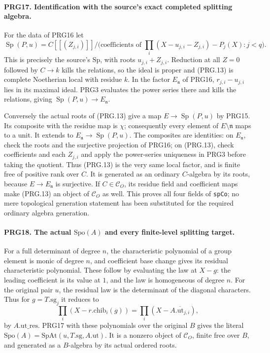 \paragraph{PRG17. Identification with the source's exact completed splitting algebra.}
\label{claim:PRG17}
For the data of PRG16 let
\[
 \operatorname{Sp}(P,u)=
 C[[(Z_{j,i})]]/
 \bigl(\text{coefficients of }
      \prod_i(X-u_{j,i}-Z_{j,i})-P_j(X):j<q\bigr).          \tag{PRG.13}
\]
This is precisely the source's \(\mathrm{Sp}\), with roots
\(u_{j,i}+Z_{j,i}\). Reduction at all \(Z=0\) followed by
\(C\to k\) kills the relations, so the ideal is proper and
(PRG.13) is complete Noetherian local with residue \(k\).
In the factor \(E_{\mathfrak n}\) of PRG16,
\(r_{j,i}-u_{j,i}\) lies in its maximal ideal. PRG3 evaluates
the power series there and kills the relations, giving
\(\operatorname{Sp}(P,u)\to E_{\mathfrak n}\).

Conversely the actual roots of (PRG.13) give a map
\(E\to\operatorname{Sp}(P,u)\) by PRG15. Its composite with
the residue map is \(\chi\); consequently every element of
\(E\setminus\mathfrak n\) maps to a unit. It extends to
\(E_{\mathfrak n}\to\operatorname{Sp}(P,u)\). The composites
are identities: on \(E_{\mathfrak n}\), check the roots and
the surjective projection of PRG16; on (PRG.13), check coefficients
and each \(Z_{j,i}\) and apply the power-series uniqueness in
PRG3 before taking the quotient. Thus (PRG.13) is the very same
local factor, and is finite free of positive rank over \(C\).
It is generated as an ordinary \(C\)-algebra by its roots,
because \(E\to E_{\mathfrak n}\) is surjective. If
\(C\in\mathcal C_O\), its residue field and coefficient maps
make (PRG.13) an object of \(\mathcal C_O\) as well.
This proves all four fields of \texttt{spCo}; no mere topological
generation statement has been substituted for the required
ordinary algebra generation.

\paragraph{PRG18. The actual \(\mathrm{Spo}(A)\) and every finite-level splitting target.}
\label{claim:PRG18}
For a full determinant of degree \(n\), the characteristic
polynomial of a group element is monic of degree \(n\), and
coefficient base change gives its residual characteristic
polynomial. These follow by evaluating the law at \(X-g\):
the leading coefficient is its value at \(1\), and the law is
homogeneous of degree \(n\). For the original pair \(u\), the
residual law is the determinant of the diagonal characters.
Thus for \(g=T.\mathrm{sg}_j\) it reduces to
\[
 \prod_i(X-r.\mathrm{chib}_i(g))
   =\prod_i(X-\overline{A.\mathrm{ut}_{j,i}}),               \tag{PRG.14}
\]
by \(A.\mathrm{ut\_res}\). PRG17 with these polynomials over
the original \(B\) gives the literal
\(\mathrm{Spo}(A)=\mathrm{SpAt}(u,T.\mathrm{sg},A.\mathrm{ut})\).
It is a nonzero object of \(\mathcal C_O\), finite free over
\(B\), and generated as a \(B\)-algebra by its actual ordered
roots.

